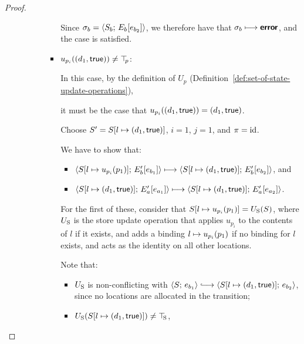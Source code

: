 \begin{proof}
\begin{enumerate}
\begin{enumerate}
\begin{itemize}
\begin{itemize}
          Since $\sigma_b = \langle S_b;\, E_b\hspace{-0.5mm}\left[e_{b_2}\right] \rangle$,
          we therefore have that $\sigma_b \longmapsto \textbf{\textsf{error}}$, and
          the case is satisfied.

        \item $u_{p_i}((d_1, \textsf{true})) \neq \top\hspace{-0.85mm}_{p}$:


          In this case, by the definition of $U_p$
          (Definition~\ref{def:set-of-state-update-operations}),
          
          it must be the case that $u_{p_i}((d_1, \textsf{true}))
          = (d_1, \textsf{true})$.

          Choose $S' = S[l \mapsto (d_1, \textsf{true})]$, $i = 1$, $j
          = 1$, and $\pi = \mathrm{id}$.

          We have to show that:
          \begin{itemize}
          \item
            $\langle S[l \mapsto u_{p_i}(p_1)];\, E'_b\hspace{-0.5mm}\left[e_{b_1}\right] \rangle
            \longmapsto
            \langle S[l \mapsto (d_1, \textsf{true})];\, E'_b\hspace{-0.5mm}\left[e_{b_2}\right] \rangle$,
            and
          \item
            $\langle S[l \mapsto (d_1, \textsf{true})];\, E'_a\hspace{-0.5mm}\left[e_{a_1}\right] \rangle
            \longmapsto
            \langle S[l \mapsto (d_1, \textsf{true})];\, E'_a\hspace{-0.5mm}\left[e_{a_2}\right] \rangle$.
          \end{itemize}

          For the first of these, consider that
          $S[l \mapsto u_{p_i}(p_1)] = U_{\mathrm{S}}(S)$, where $U_{\mathrm{S}}$ is
          the store update operation that applies $u_{p_i}$ to the
          contents of $l$ if it exists, and adds a binding
          $l \mapsto u_{p_i}(p_1)$ if no binding for
          $l$ exists, and acts as the identity on all other
          locations.

          Note that:
          \begin{itemize}
          \item $U_{\mathrm{S}}$ is non-conflicting with $\config{S}{e_{b_1}}
            \parstepsto
            \config{\extS{S}{l}{d_1}{\frozentrue}}{e_{b_2}}$,
            since no locations are allocated in the
            transition;
          \item $U_{\mathrm{S}}(S[l \mapsto (d_1, \textsf{true})]) \neq \top\hspace{-0.85mm}_{\mathrm{S}}$,
            

\end{itemize}
\end{itemize}
\end{itemize}
\end{enumerate}
\end{enumerate}
\end{proof}

